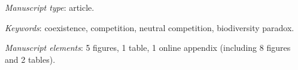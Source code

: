 \documentclass[a4paper, onecolumn, 10pt]{article}
\begin{document}
\maketitle

\bigskip
\textit{Manuscript type}: article.

\bigskip
\textit{Keywords}: coexistence, competition, neutral competition, biodiversity paradox.

\bigskip
\textit{Manuscript elements}: 5 figures, 1 table, 1 online appendix (including 8 figures and 2 tables).

\newpage


\newpage






\clearpage


\clearpage


\end{document}
